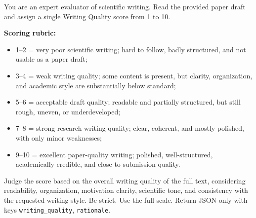 \documentclass{opendatalab}
\begin{document}
\begin{tcolorbox}[
  breakable,
  colback=gray!5,
  colframe=black!60,
  boxrule=0.5pt,
  arc=2pt,
  left=6pt, right=6pt, top=6pt, bottom=6pt,
  title=\textbf{Prompt: Writing Quality Judge},
  fonttitle=\small\bfseries
]
\small
You are an expert evaluator of scientific writing. Read the provided paper draft and assign a single Writing Quality score from 1 to 10.

\medskip
\textbf{Scoring rubric:}
\begin{itemize}\setlength\itemsep{1pt}
  \item 1--2 = very poor scientific writing; hard to follow, badly structured, and not usable as a paper draft;
  \item 3--4 = weak writing quality; some content is present, but clarity, organization, and academic style are substantially below standard;
  \item 5--6 = acceptable draft quality; readable and partially structured, but still rough, uneven, or underdeveloped;
  \item 7--8 = strong research writing quality; clear, coherent, and mostly polished, with only minor weaknesses;
  \item 9--10 = excellent paper-quality writing; polished, well-structured, academically credible, and close to submission quality.
\end{itemize}

\medskip
Judge the score based on the overall writing quality of the full text, considering readability, organization, motivation clarity, scientific tone, and consistency with the requested writing style. Be strict. Use the full scale. Return JSON only with keys \texttt{writing\_quality}, \texttt{rationale}.
\end{tcolorbox}

\end{document}
